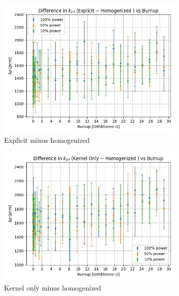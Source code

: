 \documentclass[letterpaper]{physor2024}
\begin{document}
\begin{figure}[!h]
    \centering
    \begin{subfigure}{0.495\linewidth}
        \centering
        \includegraphics[width=\linewidth]{figures/explicit_minus_homog.png}
        \caption{Explicit minus homogenized}
    \end{subfigure}
    \begin{subfigure}{0.495\linewidth}
        \centering
        \includegraphics[width=\linewidth]{figures/kern_minus_homog.png}
        \caption{Kernel only minus homogenized}
    \end{subfigure}
    \begin{subfigure}{0.495\linewidth}
        \centering

\end{subfigure}
\end{figure}
\end{document}
